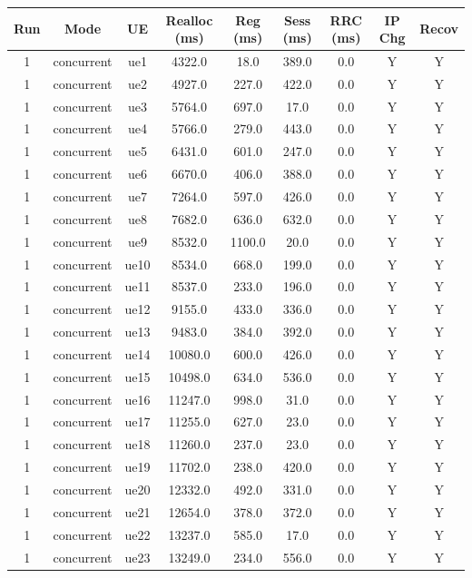 \begin{table}[ht]
\centering
\begin{tabular}{|c|c|c|c|c|c|c|c|c|}
\hline
Run & Mode & UE & Realloc (ms) & Reg (ms) & Sess (ms) & RRC (ms) & IP Chg & Recov \\
\hline
1 & concurrent & ue1 & 4322.0 & 18.0 & 389.0 & 0.0 & Y & Y \\
1 & concurrent & ue2 & 4927.0 & 227.0 & 422.0 & 0.0 & Y & Y \\
1 & concurrent & ue3 & 5764.0 & 697.0 & 17.0 & 0.0 & Y & Y \\
1 & concurrent & ue4 & 5766.0 & 279.0 & 443.0 & 0.0 & Y & Y \\
1 & concurrent & ue5 & 6431.0 & 601.0 & 247.0 & 0.0 & Y & Y \\
1 & concurrent & ue6 & 6670.0 & 406.0 & 388.0 & 0.0 & Y & Y \\
1 & concurrent & ue7 & 7264.0 & 597.0 & 426.0 & 0.0 & Y & Y \\
1 & concurrent & ue8 & 7682.0 & 636.0 & 632.0 & 0.0 & Y & Y \\
1 & concurrent & ue9 & 8532.0 & 1100.0 & 20.0 & 0.0 & Y & Y \\
1 & concurrent & ue10 & 8534.0 & 668.0 & 199.0 & 0.0 & Y & Y \\
1 & concurrent & ue11 & 8537.0 & 233.0 & 196.0 & 0.0 & Y & Y \\
1 & concurrent & ue12 & 9155.0 & 433.0 & 336.0 & 0.0 & Y & Y \\
1 & concurrent & ue13 & 9483.0 & 384.0 & 392.0 & 0.0 & Y & Y \\
1 & concurrent & ue14 & 10080.0 & 600.0 & 426.0 & 0.0 & Y & Y \\
1 & concurrent & ue15 & 10498.0 & 634.0 & 536.0 & 0.0 & Y & Y \\
1 & concurrent & ue16 & 11247.0 & 998.0 & 31.0 & 0.0 & Y & Y \\
1 & concurrent & ue17 & 11255.0 & 627.0 & 23.0 & 0.0 & Y & Y \\
1 & concurrent & ue18 & 11260.0 & 237.0 & 23.0 & 0.0 & Y & Y \\
1 & concurrent & ue19 & 11702.0 & 238.0 & 420.0 & 0.0 & Y & Y \\
1 & concurrent & ue20 & 12332.0 & 492.0 & 331.0 & 0.0 & Y & Y \\
1 & concurrent & ue21 & 12654.0 & 378.0 & 372.0 & 0.0 & Y & Y \\
1 & concurrent & ue22 & 13237.0 & 585.0 & 17.0 & 0.0 & Y & Y \\
1 & concurrent & ue23 & 13249.0 & 234.0 & 556.0 & 0.0 & Y & Y \\

\end{tabular}
\end{table}
